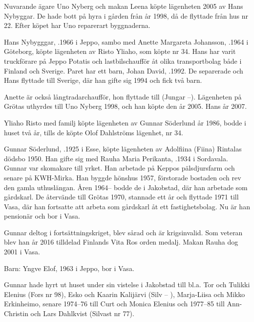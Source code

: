

Nuvarande ägare Uno Nyberg och makan Leena köpte lägenheten 2005 av Hans Nybyggar. De hade bott på hyra i gården från år 1998, då de flyttade från hus nr 22. Efter köpet har Uno reparerart byggnaderna.\jhvspace{}



Hans Nybygggar, .1966 i Jeppo, sambo med Anette Margareta Johansson, .1964 i Göteborg, köpte lägenheten av Risto Yliaho, som köpte nr 34.  Hans har varit truckförare på Jeppo Potatis och lastbilschaufför åt olika transportbolag både i Finland och Sverige. Paret har ett barn, Johan David, .1992. De separerade och Hans flyttade till Sverige, där han gifte sig 1994 och fick två barn.

Anette är också långtradarchaufför, hon flyttade till (Jungar --).  Lägenheten på Grötas uthyrdes till Uno Nyberg 1998, och han köpte den år 2005.
Hans \textdied år 2007.


Yliaho Risto med familj köpte lägenheten av Gunnar Söderlund år 1986, bodde i huset två år, tills de köpte Olof Dahlströms lägenhet, nr 34.\jhvspace{}


Gunnar Söderlund, .1925 i Esse, köpte lägenheten av Adolfiina (Fiina) Rintalas dödsbo 1950. Han gifte sig med Rauha Maria Perikanta, .1934 i Sordavala. Gunnar var skomakare till yrket. Han arbetade på Keppos pälsdjursfarm och senare på KWH-Mirka. Han byggde hönshus 1957, förstorade bostaden och rev den gamla uthuslängan. Åren 1964-- bodde de i Jakobstad, där han arbetade som gårdskarl. De återvände till Grötas 1970, stannade ett år och flyttade 1971 till Vasa, där han fortsatte  att arbeta som  gårdskarl åt ett fastighetsbolag. Nu är han pensionär och bor i Vasa.

Gunnar deltog i fortsättningskriget, blev sårad och är krigsinvalid. Som veteran blev han år 2016 tilldelad Finlands Vita Ros orden medalj. Makan Rauha dog 2001 i Vasa.

Barn: Yngve Elof,  1963 i Jeppo, bor i Vasa.

Gunnar hade hyrt ut huset under sin vistelse i Jakobstad till bl.a. Tor och Tulikki Elenius (Fors nr 98), Esko och Kaarin Kalijärvi (Silv -- ), Marja-Liisa och Mikko Erkinheimo, senare 1974--76 till Curt och Monica Elenius och 1977--85 till Ann-Christin och Lars Dahlkvist (Silvast nr 77).


